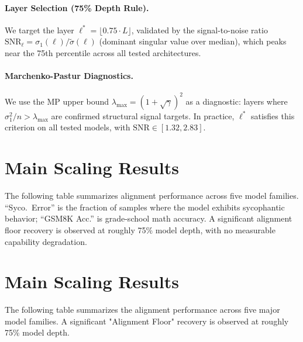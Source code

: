 \documentclass{article}
\begin{document}
\paragraph{Layer Selection (75\% Depth Rule).}
We target the layer $\ell^* = \lfloor 0.75 \cdot L \rfloor$, validated by the signal-to-noise ratio $\mathrm{SNR}_\ell = \sigma_1(\ell) / \tilde{\sigma}(\ell)$ (dominant singular value over median), which peaks near the 75th percentile across all tested architectures.

\paragraph{Marchenko-Pastur Diagnostics.}
We use the MP upper bound $\lambda_{\max} = (1 + \sqrt{\gamma})^2$ as a diagnostic: layers where $\sigma_1^2/n > \lambda_{\max}$ are confirmed structural signal targets. In practice, $\ell^*$ satisfies this criterion on all tested models, with $\mathrm{SNR} \in [1.32, 2.83]$.

\section{Main Scaling Results}
The following table summarizes alignment performance across five model families. ``Syco.\ Error'' is the fraction of samples where the model exhibits sycophantic behavior; ``GSM8K Acc.'' is grade-school math accuracy. A significant alignment floor recovery is observed at roughly 75\% model depth, with no measurable capability degradation.

\section{Main Scaling Results}
The following table summarizes the alignment performance across five major model families. A significant "Alignment Floor" recovery is observed at roughly 75\% model depth.
\end{document}

